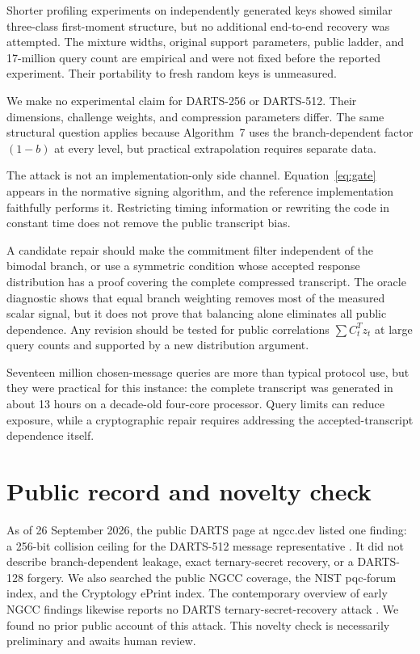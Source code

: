 \documentclass[11pt,a4paper]{article}
\begin{document}
Shorter profiling experiments on independently generated keys showed similar
three-class first-moment structure, but no additional end-to-end recovery was
attempted.  The mixture widths, original support parameters, public ladder,
and 17-million query count are empirical and were not fixed before the
reported experiment.  Their portability to fresh random keys is unmeasured.

We make no experimental claim for DARTS-256 or DARTS-512.  Their dimensions,
challenge weights, and compression parameters differ.  The same structural
question applies because Algorithm~7 uses the branch-dependent factor
$(1-b)$ at every level, but practical extrapolation requires separate data.

The attack is not an implementation-only side channel.  Equation~\eqref{eq:gate}
appears in the normative signing algorithm, and the reference implementation
faithfully performs it.  Restricting timing information or rewriting the code
in constant time does not remove the public transcript bias.

A candidate repair should make the commitment filter independent of the
bimodal branch, or use a symmetric condition whose accepted response
distribution has a proof covering the complete compressed transcript.  The
oracle diagnostic shows that equal branch weighting removes most of the
measured scalar signal, but it does not prove that balancing alone eliminates
all public dependence.  Any revision should be tested for public correlations
$\sum C_t^Tz_t$ at large query counts and supported by a new distribution
argument.

Seventeen million chosen-message queries are more than typical protocol use,
but they were practical for this instance: the complete transcript was
generated in about 13 hours on a decade-old four-core processor.  Query limits
can reduce exposure, while a cryptographic repair requires addressing the
accepted-transcript dependence itself.

\section{Public record and novelty check}

As of 26 September 2026, the public DARTS page at ngcc.dev listed one finding:
a 256-bit collision ceiling for the DARTS-512 message representative
\cite{NGCCDARTS}.  It did not describe branch-dependent leakage, exact
ternary-secret recovery, or a DARTS-128 forgery.  We also searched the public
NGCC coverage, the NIST pqc-forum index, and the Cryptology ePrint index.  The
contemporary overview of early NGCC findings likewise reports no DARTS
ternary-secret-recovery attack \cite{Ivezic}.  We found no prior public account
of this attack.  This novelty check is necessarily preliminary and awaits
human review.
\end{document}
